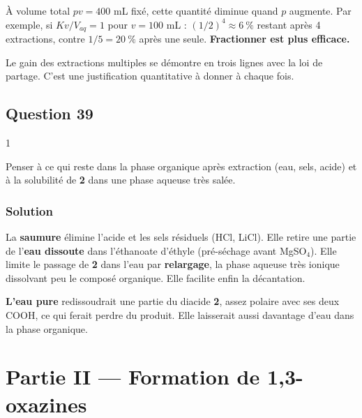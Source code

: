 \documentclass[11pt,a4paper]{article}
\newcommand{\equationajustee}[1]{%
  \sbox{\boiteequation}{$\displaystyle #1$}%
  \ifdim\wd\boiteequation>\linewidth
    \[\resizebox{\linewidth}{!}{\usebox{\boiteequation}}\]%
  \else
    \[#1\]%
  \fi}
\begin{document}
\equationajustee{n_{\mathrm{restant}}=n_0\left(\frac{V_{aq}}{V_{aq}+K\,v}\right)^p}

À volume total \(pv=400\) mL fixé, cette quantité diminue quand \(p\) augmente. Par exemple, si \(Kv/V_{aq}=1\) pour \(v=100\) mL : \((1/2)^4\approx6\ \%\) restant après 4 extractions, contre \(1/5=20\ \%\) après une seule. \textbf{Fractionner est plus efficace.}

\begin{methode}

Le gain des extractions multiples se démontre en trois lignes avec la loi de partage. C'est une justification quantitative à donner à chaque fois.

\end{methode}

\hypertarget{question-39}{%
\subsection{Question 39}\label{question-39}}

\begin{indication}{1}

Penser à ce qui reste dans la phase organique après extraction (eau, sels, acide) et à la solubilité de \textbf{2} dans une phase aqueuse très salée.

\end{indication}

\hypertarget{solution-38}{%
\subsubsection{Solution}\label{solution-38}}

La \textbf{saumure} élimine l'acide et les sels résiduels (HCl, LiCl). Elle retire une partie de l'\textbf{eau dissoute} dans l'éthanoate d'éthyle (pré-séchage avant MgSO\(_4\)). Elle limite le passage de \textbf{2} dans l'eau par \textbf{relargage}, la phase aqueuse très ionique dissolvant peu le composé organique. Elle facilite enfin la décantation.

\textbf{L'eau pure} redissoudrait une partie du diacide \textbf{2}, assez polaire avec ses deux COOH, ce qui ferait perdre du produit. Elle laisserait aussi davantage d'eau dans la phase organique.

\hypertarget{partie-ii-formation-de-13-oxazines}{%
\section{Partie II --- Formation de 1,3-oxazines}\label{partie-ii-formation-de-13-oxazines}}
\end{document}

